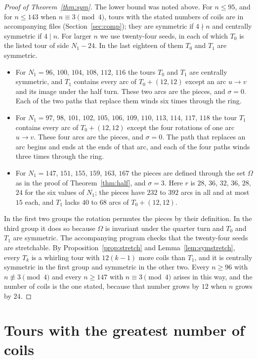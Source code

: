 \documentclass[11pt]{amsart}
\theoremstyle{remark}
\begin{document}
\begin{proof}[Proof of Theorem~\ref{thm:sym}]
The lower bound was noted above. For $n\le95$, and for $n\le143$ when $n\equiv3\pmod 4$, tours with the stated
numbers of coils are in accompanying files (Section~\ref{sec:comp}); they are symmetric if $4\nmid n$ and centrally
symmetric if $4\mid n$. For larger $n$ we use twenty-four seeds, in each of which $T_0$ is the listed tour of side
$N_1-24$. In the last eighteen of them $T_0$ and $T_1$ are symmetric.
\begin{itemize}
\item For $N_1=96$, $100$, $104$, $108$, $112$, $116$ the tours $T_0$ and $T_1$ are centrally symmetric, and $T_1$
contains every arc of $T_0+(12,12)$ except an arc $u\to v$ and its image under the half turn. These two arcs are the
pieces, and $\sigma=0$. Each of the two paths that replace them winds six times through the ring.
\item For $N_1=97$, $98$, $101$, $102$, $105$, $106$, $109$, $110$, $113$, $114$, $117$, $118$ the tour $T_1$
contains every arc of $T_0+(12,12)$ except the four rotations of one arc $u\to v$. These four arcs are the pieces,
and $\sigma=0$. The path that replaces an arc begins and ends at the ends of that arc, and each of the four paths
winds three times through the ring.
\item For $N_1=147$, $151$, $155$, $159$, $163$, $167$ the pieces are defined through the set $\Omega$ as in the proof
of Theorem~\ref{thm:half}, and $\sigma=3$. Here $r$ is $28$, $36$, $32$, $36$, $28$, $24$ for the six values of
$N_1$; the pieces have $232$ to $392$ arcs in all and at most $15$ each, and $T_1$ lacks $40$ to $68$ arcs of
$T_0+(12,12)$.
\end{itemize}
In the first two groups the rotation permutes the pieces by their definition. In the third group it does so
because $\Omega$ is invariant under the quarter turn and $T_0$ and $T_1$ are symmetric.
The accompanying program checks that the twenty-four seeds are stretchable. By Proposition~\ref{prop:stretch} and
Lemma~\ref{lem:symstretch}, every $T_k$ is a whirling tour with $12(k-1)$ more coils than $T_1$, and it is centrally
symmetric in the first group and symmetric in the other two. Every $n\ge96$ with $n\not\equiv3\pmod 4$ and every
$n\ge147$ with $n\equiv3\pmod 4$ arises in this way, and the number of coils is the one stated, because that number
grows by $12$ when $n$ grows by $24$.
\end{proof}

\section{Tours with the greatest number of coils}\label{sec:max}
\end{document}

